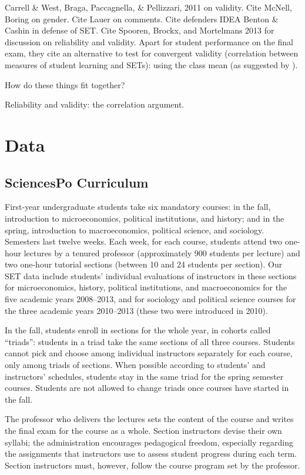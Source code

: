 \documentclass[12pt]{article}
\begin{document}
Carrell \& West, Braga, Paccagnella, \& Pellizzari, 2011 on validity.
Cite McNell, Boring on gender.
Cite Lauer on comments.
Cite defenders IDEA Benton \& Cashin in defense of SET.  
Cite Spooren, Brockx, and Mortelmans 2013 for discussion on reliability and validity. 
Apart for student performance on 
the final exam, they cite an alternative to test for convergent validity 
(correlation between measures of student learning 
and SETs): using the class mean (as suggested by \cite{clayson09}). 

How do these things fit together?

Reliability and validity: the correlation argument.

\section{Data}
\subsection{SciencesPo Curriculum}
First-year undergraduate students take six mandatory courses: in the fall,
introduction to microeconomics, political institutions, and history; 
and in the spring, introduction to macroeconomics, political 
science, and sociology.
Semesters last twelve weeks.
Each week, for each course, students attend two one-hour lectures by a tenured professor
(approximately 900 students per lecture) and two one-hour tutorial sections 
(between 10 and 24 students per section). 
Our SET data include students' individual evaluations of instructors 
in these sections for microeconomics, history, political institutions, and 
macroeconomics for the five academic years 2008--2013,
and for sociology and political science courses for the three academic years 2010--2013 
(these two were introduced in 2010).

In the fall, students enroll in sections for the whole year, in cohorts called ``triads'':
students in a triad take the same sections of all three courses.
Students cannot pick and choose among individual instructors separately for
each course, only among triads of sections.
When possible according to students' and instructors' schedules, 
students stay in the same triad for the spring semester courses. 
Students are not allowed to change triads once courses have started in the fall. 

The professor who delivers the lectures sets the content of the course and 
writes the final exam for the course as a whole. 
Section instructors devise their own syllabi;
the administration encourages pedagogical freedom, especially regarding 
the assignments that instructors use to assess student progress during each term. 
Section instructors must, however, follow the course program set by the professor. 
\end{document}
